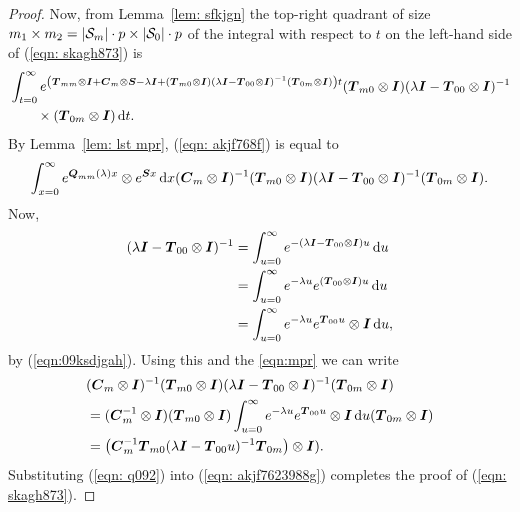 \begin{proof}
	Now, from Lemma~\ref{lem: sfkjgn} the top-right quadrant of size \(m_1\times m_2=|\mathcal{S}_m|\cdot p\times |\mathcal{S}_0|\cdot p\) of the integral with respect to \(t\) on the left-hand side of (\ref{eqn: skagh873}) is 
	\begin{align}
		&\int_{t=0}^\infty e^{\left(\boldsymbol T_{mm}\otimes \boldsymbol I + \boldsymbol C_m\otimes \boldsymbol S - \lambda \boldsymbol I+ (\boldsymbol T_{m0}\otimes \boldsymbol I)(\lambda \boldsymbol I-\boldsymbol T_{00}\otimes \boldsymbol I)^{-1}(\boldsymbol T_{0m}\otimes \boldsymbol I)\right)t}(\boldsymbol T_{m0}\otimes \boldsymbol I)(\lambda \boldsymbol I - \boldsymbol T_{00}\otimes \boldsymbol I)^{-1} \nonumber 
		\\&\qquad\times (\boldsymbol T_{0m}\otimes \boldsymbol I)\, \mathrm{d} t. \label{eqn: akjf768f}
	\end{align}
	By Lemma~\ref{lem: lst mpr}, (\ref{eqn: akjf768f}) is equal to 
	\begin{align}
		\int_{x=0}^\infty e^{\boldsymbol Q_{mm}(\lambda)x}\otimes e^{\boldsymbol Sx}\, \mathrm{d} x(\boldsymbol C_m\otimes \boldsymbol I)^{-1}(\boldsymbol T_{m0}\otimes \boldsymbol I)(\lambda \boldsymbol I - \boldsymbol T_{00}\otimes \boldsymbol I)^{-1}(\boldsymbol T_{0m}\otimes \boldsymbol I) . \label{eqn: akjf7623988g}
	\end{align}
	Now, 
	\begin{align*}
		\displaystyle (\lambda \boldsymbol I - \boldsymbol T_{00}\otimes \boldsymbol I)^{-1} &= \int_{u=0}^\infty e^{-(\lambda \boldsymbol I - \boldsymbol T_{00}\otimes \boldsymbol I)u}\, \mathrm{d} u \\&= \int_{u=0}^\infty e^{-\lambda u} e^{(\boldsymbol T_{00}\otimes \boldsymbol I)u}\, \mathrm{d} u \\&= \int_{u=0}^\infty e^{-\lambda u} e^{\boldsymbol T_{00}u}\otimes \boldsymbol I \, \mathrm{d} u,
	\end{align*} by (\ref{eqn:09ksdjgah}). Using this and the \ref{eqn:mpr} we can write  
	\begin{align}
		&(\boldsymbol C_m\otimes \boldsymbol I)^{-1}(\boldsymbol T_{m0}\otimes \boldsymbol I)(\lambda \boldsymbol I - \boldsymbol T_{00}\otimes \boldsymbol I)^{-1}(\boldsymbol T_{0m}\otimes \boldsymbol I) \nonumber
		\\&= (\boldsymbol C_m^{-1}\otimes \boldsymbol I)(\boldsymbol T_{m0}\otimes \boldsymbol I)\int_{u=0}^\infty e^{-\lambda u} e^{\boldsymbol T_{00}u}\otimes \boldsymbol I \, \mathrm{d} u(\boldsymbol T_{0m}\otimes \boldsymbol I) \nonumber
		\\&= \left(\boldsymbol C_m^{-1}\boldsymbol T_{m0}(\lambda \boldsymbol I-\boldsymbol T_{00}u)^{-1}\boldsymbol T_{0m}\right)\otimes \boldsymbol I).\label{eqn: q092}
	\end{align}
	Substituting (\ref{eqn: q092}) into (\ref{eqn: akjf7623988g}) completes the proof of (\ref{eqn: skagh873}). 


\end{proof}
